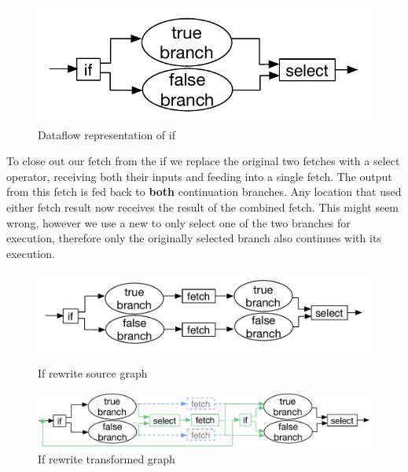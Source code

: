 \begin{figure}
	\includegraphics[width=\textwidth]{Figures/basic-if}
	\caption{Dataflow representation of if}
	\label{fig:basic-if}
\end{figure}

To close out our fetch from the if we replace the original two fetches with a select operator, receiving both their inputs and feeding into a single fetch.
The output from this fetch is fed back to \textbf{both} continuation branches.
Any location that used either fetch result now receives the result of the combined fetch.
This might seem wrong, however we use a new \opite{} to only select one of the two branches for execution, therefore only the originally selected branch also continues with its execution.

\begin{figure}
	\includegraphics[width=\textwidth]{Figures/basic-if-rewrite-original}
	\caption{If rewrite source graph}
	\label{fig:if-rewrite-graph-before}
	\includegraphics[width=\textwidth]{Figures/basic-if-rewrite}
	\caption{If rewrite transformed graph}
	\label{fig:if-rewrite-graph-after}
\end{figure}
